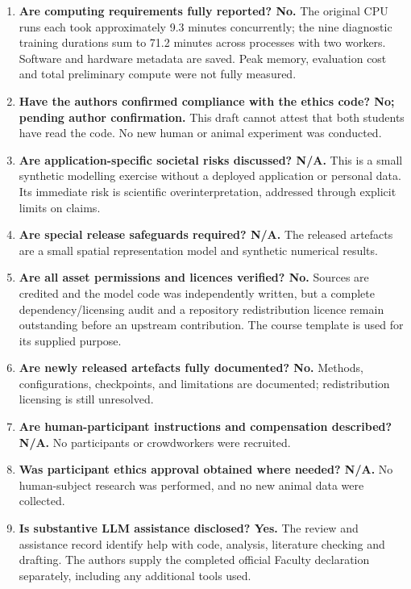 \begin{enumerate}
\item \textbf{Are computing requirements fully reported? No.} The original CPU runs each took approximately 9.3 minutes concurrently; the nine diagnostic training durations sum to 71.2 minutes across processes with two workers. Software and hardware metadata are saved. Peak memory, evaluation cost and total preliminary compute were not fully measured.
\item \textbf{Have the authors confirmed compliance with the ethics code? No; pending author confirmation.} This draft cannot attest that both students have read the code. No new human or animal experiment was conducted.
\item \textbf{Are application-specific societal risks discussed? N/A.} This is a small synthetic modelling exercise without a deployed application or personal data. Its immediate risk is scientific overinterpretation, addressed through explicit limits on claims.
\item \textbf{Are special release safeguards required? N/A.} The released artefacts are a small spatial representation model and synthetic numerical results.
\item \textbf{Are all asset permissions and licences verified? No.} Sources are credited and the model code was independently written, but a complete dependency/licensing audit and a repository redistribution licence remain outstanding before an upstream contribution. The course template is used for its supplied purpose.
\item \textbf{Are newly released artefacts fully documented? No.} Methods, configurations, checkpoints, and limitations are documented; redistribution licensing is still unresolved.
\item \textbf{Are human-participant instructions and compensation described? N/A.} No participants or crowdworkers were recruited.
\item \textbf{Was participant ethics approval obtained where needed? N/A.} No human-subject research was performed, and no new animal data were collected.
\item \textbf{Is substantive LLM assistance disclosed? Yes.} The review and assistance record identify help with code, analysis, literature checking and drafting. The authors supply the completed official Faculty declaration separately, including any additional tools used.
\end{enumerate}
